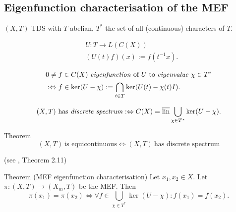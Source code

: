 \subsection{Eigenfunction characterisation of the MEF}
\begin{frame}
  $(X,T)$ TDS with $T$ abelian, $T^*$ the set of all (continuous) characters of $T$.
\begin{definition}
  \begin{equation*}
    \begin{split}
      &U : T \longrightarrow L(C(X)) \\
      &(U(t) f)(x) := f(t^{-1}x).
    \end{split}
  \end{equation*}
   \end{definition}
   \pause
   \begin{definition}
   \begin{equation*}
    \begin{split}
      &0 \neq f \in C(X) \ \text{\emph{eigenfunction} of} \ U \ \text{to \emph{eigenvalue}} \ \chi \in T^*   \\
 &:\Leftrightarrow f \in \ker (U-\chi):= \bigcap_{t \in T} \ker (U(t)- \chi (t)I).
    \end{split}
      \end{equation*}
   \end{definition}
\end{frame}
\begin{frame}[fragile]
 \begin{definition}
  \begin{equation*}
    (X,T) \ \text{has \emph{discrete spectrum}}:\Leftrightarrow C(X) = \overline{\operatorname{lin}} \bigcup_{\chi \in T^*} \ker (U- \chi).
  \end{equation*}
\end{definition}
\pause 
  \begin{alertblock}{Theorem}%
  \begin{equation*}
    (X,T) \ \text{is equicontinuous} \Leftrightarrow (X,T) \ \text{has discrete spectrum}
  \end{equation*}

    \hfill(see \cite{HK2023}, Theorem 2.11)
\end{alertblock}
\pause
  \begin{alertblock}{Theorem (MEF eigenfunction characterisation)}
  \label{thm:MEF_EFchar}
  Let $x_1,x_2 \in X$. Let $\pi : (X,T) \to (X_m,T)$ be the MEF.
  Then
  \begin{equation*}
  \pi (x_1) = \pi (x_2) \Leftrightarrow 
    \forall f \in \bigcup_{\chi \in T^*} \ker (U- \chi) : f(x_1) = f(x_2).
  \end{equation*}
\end{alertblock}
\end{frame}
